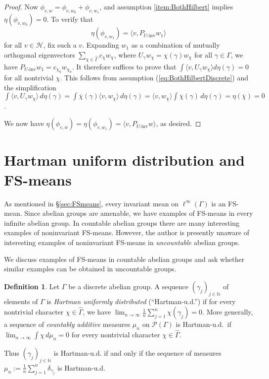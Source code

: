 \documentclass[12pt]{amsart} \usepackage{amsmath,centernot,amssymb,leftindex}
\numberwithin{theorem}{section}
\numberwithin{equation}{section}
\theoremstyle{definition}
\newtheorem{definition}[theorem]{Definition}
\begin{document}
\begin{proof}
	Now $\phi_{v,w}=\phi_{v,w_{0}}+\phi_{v,w_{1}}$, and assumption \ref{item:BothHilbert} implies $\eta(\phi_{v,w_{0}})=0$. To verify that \begin{equation}\label{eq:etaphi} \eta(\phi_{v,w_{1}})=\langle v, P_{U\text{-inv}}w_{1}\rangle
	\end{equation} for all $v\in \mathcal H$,  fix such a $v$.  Expanding $w_{1}$ as a combination of mutually orthogonal eigenvectors $\sum_{\chi \in \widehat{\Gamma}} c_{\chi}w_{\chi}$, where $U_{\gamma} w_{\chi}=\chi(\gamma) w_{\chi}$ for all $\gamma\in \Gamma$, we have $P_{U\text{-inv}} w_{1}= c_{\chi_{0}}w_{\chi_{0}}$.  It therefore suffices to prove that $\int \langle v,U_{\gamma} w_{\chi}\rangle d\eta(\gamma)=0$ for all nontrivial $\chi$.  This follows from assumption (\ref{eq:BothHilbertDiscrete}) and the simplification $\int \langle v, U_{\gamma} w_{\chi}\rangle\, d\eta(\gamma) = \int \overline{\chi}(\gamma)\langle v,w_{\chi}\rangle \, d\eta(\gamma) =  \langle v,w_{\chi}\rangle \int \overline{\chi}(\gamma) \, d\eta(\gamma)=\eta(\overline{\chi})=0$. 
	
	
	We now have $\eta(\phi_{v,w})=\eta(\phi_{v,w_{1}})=\langle v,P_{U\text{-inv}} w\rangle$, as desired. \end{proof}




\section{Hartman uniform distribution and FS-means}\label{sec:HartmanUD}
As mentioned in \S\ref{sec:FSmeans}, every invariant mean on $\ell^{\infty}(\Gamma)$ is an FS-mean.  Since abelian groups are amenable, we have examples of FS-means in every infinite abelian group.  In countable abelian groups there are many interesting examples of non\text{-}invariant FS-means.  However, the author is presently unaware of interesting examples of non\text{-}invariant FS-means in \emph{uncountable} abelian groups.

We discuss examples of FS-means in countable abelian groups and ask whether similar examples can be obtained in uncountable groups.

\begin{definition}\label{def:HartmanUD}
	Let $\Gamma$ be a discrete abelian group.  A sequence $(\gamma_{j})_{j\in \mathbb N}$ of elements of $\Gamma$ is \emph{Hartman uniformly distributed} (``Hartman-u.d.'') if for every nontrivial character $\chi\in\widehat{\Gamma}$, we have $\lim_{n\to\infty}\frac{1}{n}\sum_{j=1}^{n}\chi(\gamma_{j})=0$.  More generally, a sequence of \emph{countably additive} measures $\mu_{n}$ on $\mathcal P(\Gamma)$ is Hartman-u.d.~if $\lim_{n\to\infty} \int \chi \, d\mu_{n}=0$ for every nontrivial character $\chi\in\widehat{\Gamma}$.  
\end{definition}
Thus $(\gamma_{j})_{j\in \mathbb N}$ is Hartman-u.d. if and only if the sequence of measures $\mu_{n}:=\frac{1}{n}\sum_{j=1}^{n}\delta_{\gamma_{j}}$ is Hartman-u.d.
\end{document}
